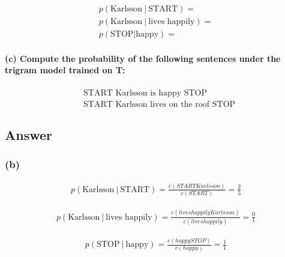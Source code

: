\documentclass{article}
\newcommand\given[1][]{\:#1\vert\:}
\begin{document}
\begin{equation*}
    \begin{split}
    p(\text{Karlsson} \given \text{START})=\\
    p(\text{Karlsson} \given \text{lives
happily})=\\
    p(\text{STOP}|\text{happy})=
    \end{split}
\end{equation*}

\paragraph{(c) Compute the probability of the following sentences under the trigram model trained on T:}

\begin{equation*}
    \begin{split}
    &\text{START Karlsson is happy STOP}\\
    &\text{START Karlsson lives on the roof STOP}
    \end{split}
\end{equation*}

\subsection*{Answer}

\subsubsection*{(b)}

\begin{equation*}
    \begin{split}
    p(\text{Karlsson} \given \text{START}) = \frac{c(START
Karlsson)}{c(START)} = \frac{2}{5}
    \end{split}
\end{equation*}

\begin{equation*}
    \begin{split}
    p(\text{Karlsson} \given \text{lives
happily}) = \frac{c(lives
happily
Karlsson)}{c(lives
happily)} = \frac{0}{1}
    \end{split}
\end{equation*}


\begin{equation*}
    \begin{split}
    p(\text{STOP} \given \text{happy}) = \frac{c(happy
STOP)}{c(happy)} = \frac{1}{1}
    \end{split}
\end{equation*}
\end{document}
